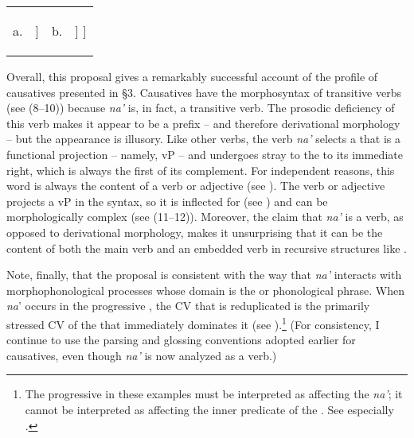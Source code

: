 \documentclass[output=paper,
modfonts
]{LSP/langsci}
\begin{document}
\begin{exe}
\begin{xlist}
\ea \label{ex:chung:27}
\begin{tabularx}{\linewidth-0.1em}[t]{lXlX}
	a. &
	\begin{forest}
			[ω
				[na']
				[ω]
			]
	\end{forest} &
b. &
\begin{forest}
				[ω
					[na']
					[ω
						[fan-\dots\dots]
					]
				]
	\end{forest} \\	
\end{tabularx}\label{ex:strayadjna'}
\z

Overall, this proposal gives a remarkably successful account of the
 profile of  causatives presented in \S3.
Causatives have the morphosyntax of transitive verbs (see (8--10))
because \emph{na'} is, in fact, a transitive verb. The prosodic
deficiency of this verb makes it appear to be a prefix -- and therefore
derivational morphology -- but the appearance is illusory. Like other
 verbs, the verb \emph{na'} selects a 
that is a functional projection -- namely, vP -- and undergoes stray
 to the  to its immediate right, which is
always the first  of its complement. For independent
reasons, this word is always the content of a verb or adjective (see
). The verb or adjective projects a vP in the syntax, so it is
inflected for  (see ) and can be morphologically
complex (see (11--12)). Moreover, the claim that \emph{na'} is a verb, as
opposed to derivational morphology, makes it unsurprising that it can be
the content of both the main verb and an embedded verb in recursive
structures like .

Note, finally, that the proposal is consistent with the way that
\emph{na'} interacts with morphophonological processes whose domain is
the  or phonological phrase. When \emph{na}' occurs in
the progressive , the CV that is reduplicated is the primarily
stressed CV of the  that immediately dominates it (see
\citealt[79--81]{gibson1980}).\footnote{The progressive  in these examples
  must be interpreted as affecting the  \emph{na'}; it cannot
  be interpreted as affecting the inner predicate of the . See
  especially .} (For consistency, I continue to use the parsing and
glossing conventions adopted earlier for causatives, even though
\emph{na'} is now analyzed as a  verb.)


\end{xlist}
\end{exe}
\end{document}

